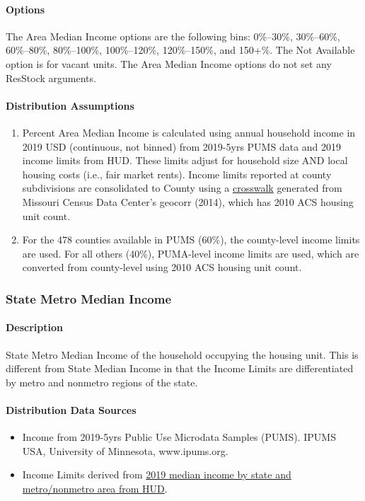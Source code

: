\paragraph{Options}
The Area Median Income options are the following bins: 0\%--30\%, 30\%--60\%, 60\%--80\%, 80\%--100\%, 100\%--120\%, 120\%--150\%, and 150+\%. The Not Available option is for vacant units. The Area Median Income options do not set any ResStock arguments.

\paragraph{Distribution Assumptions}
\begin{enumerate}
\item
    Percent Area Median Income is calculated using annual household income in
  2019 USD (continuous, not binned) from 2019-5yrs PUMS data and 2019
  income limits from HUD. These limits adjust for household size AND
  local housing costs (i.e., fair market rents). Income limits reported at
  county subdivisions are consolidated to County using a \href{https://mcdc.missouri.edu/applications/geocorr2014.html}{crosswalk}
  generated from Missouri Census Data Center's geocorr
  (2014), which has 2010 ACS housing unit count.
\item 
    For the 478 counties
    available in PUMS (60\%), the county-level income limits are used. For
    all others (40\%), PUMA-level income limits are used, which are
    converted from county-level using 2010 ACS housing unit count.
\end{enumerate}

\subsubsection{State Metro Median Income}\label{state_metro_median_income}
\paragraph{Description}
State Metro Median Income of the household occupying the housing unit.
This is different from State Median Income in that the Income Limits are
differentiated by metro and nonmetro regions of the state.

\paragraph{Distribution Data Sources}
\begin{itemize}
\item
  Income from 2019-5yrs Public Use Microdata Samples (PUMS). IPUMS USA, University of Minnesota, www.ipums.org.
\item
  Income Limits derived from \href{Income from 2019-5yrs Public Use Microdata Samples (PUMS). IPUMS USA, University of Minnesota, www.ipums.org.}{2019 median income by state and metro/nonmetro area from HUD}.
\end{itemize}


